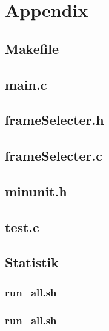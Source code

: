 \section{Appendix}

\subsection{Makefile}

\pagebreak

\subsection{main.c}

\pagebreak

\subsection{frameSelecter.h}

\pagebreak

\subsection{frameSelecter.c}

\pagebreak

\subsection{minunit.h}

\pagebreak

\subsection{test.c}
\label{app:test}

\pagebreak

\subsection{Statistik}
\label{app:statestik}
\subsubsection{run\_all.sh}

\subsubsection{run\_all.sh}

\pagebreak